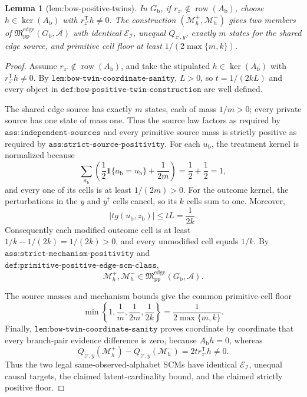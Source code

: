 \documentclass{article}
\newtheorem{lemma}{Lemma}
\begin{document}
\begin{lemma}[lem:bow-positive-twins]\label{lem:bow-positive-twins}
In \(G_{\mathrm b}\), if \(r_{z^{\circ}}\notin\operatorname{row}(A_{\mathrm b})\), choose \(h\in\ker(A_{\mathrm b})\) with \(r_{z^{\circ}}^{\mathsf T}h\ne0\). The construction \((\mathcal M_h^{+},\mathcal M_h^{-})\) gives two members of \(\mathfrak M_{\mathrm{pp}}^{\mathrm{edge}}(G_{\mathrm b},\mathcal A)\) with identical \(\mathcal E_{\mathcal I}\), unequal \(Q_{z^{\circ},y}\), exactly \(m\) states for the shared edge source, and primitive cell floor at least \(1/(2\max\{m,k\})\).
\end{lemma}
\begin{proof}
Assume \(r_{z^{\circ}}\notin\operatorname{row}(A_{\mathrm b})\), and take the stipulated \(h\in\ker(A_{\mathrm b})\) with \(r_{z^{\circ}}^{\mathsf T}h\neq0\).  By \(\texttt{lem:bow-twin-coordinate-sanity}\), \(L>0\), so \(t=1/(2kL)\) and every object in \(\texttt{def:bow-positive-twin-construction}\) are well defined.

The shared edge source has exactly \(m\) states, each of mass \(1/m>0\); every private source has one state of mass one.  Thus the source law factors as required by \(\texttt{ass:independent-sources}\) and every primitive source mass is strictly positive as required by \(\texttt{ass:strict-source-positivity}\).  For each \(u_{\mathrm b}\), the treatment kernel is normalized because
\[
\sum_{a_{\mathrm b}}\left(\frac12\mathbf 1\{a_{\mathrm b}=u_{\mathrm b}\}+\frac1{2m}\right)=\frac12+\frac12=1,
\]
and every one of its cells is at least \(1/(2m)>0\).  For the outcome kernel, the perturbations in the \(y\) and \(y^{\dagger}\) cells cancel, so its \(k\) cells sum to one.  Moreover,
\[
\lvert t g(u_{\mathrm b},z_{\mathrm b})\rvert\leq tL=\frac1{2k}.
\]
Consequently each modified outcome cell is at least \(1/k-1/(2k)=1/(2k)>0\), and every unmodified cell equals \(1/k\).  By \(\texttt{ass:strict-mechanism-positivity}\) and \(\texttt{def:primitive-positive-edge-scm-class}\),
\[
\mathcal M_h^+,\mathcal M_h^-\in
\mathfrak M_{\mathrm{pp}}^{\mathrm{edge}}(G_{\mathrm b},\mathcal A).
\]

The source masses and mechanism bounds give the common primitive-cell floor
\[
\min\left\{1,\frac1m,\frac1{2m},\frac1{2k}\right\}
=\frac1{2\max\{m,k\}}.
\]
Finally, \(\texttt{lem:bow-twin-coordinate-sanity}\) proves coordinate by coordinate that every branch-pair evidence difference is zero, because \(A_{\mathrm b}h=0\), whereas
\[
Q_{z^{\circ},y}(\mathcal M_h^+)-Q_{z^{\circ},y}(\mathcal M_h^-)
=2t r_{z^{\circ}}^{\mathsf T}h\neq0.
\]
Thus the two legal same-observed-alphabet SCMs have identical \(\mathcal E_{\mathcal I}\), unequal causal targets, the claimed latent-cardinality bound, and the claimed strictly positive floor.
\end{proof}
\end{document}
